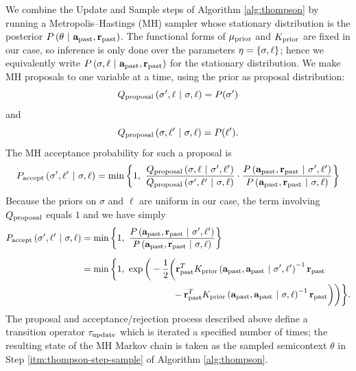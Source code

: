 We combine the Update and Sample steps of Algorithm \ref{alg:thompson} by
running a Metropolis--Hastings (MH) sampler whose stationary distribution is the
posterior $P\left( \theta \ \middle\vert\  \mathbf{a}_{\textrm{past}}, \mathbf{r}_{\textrm{past}} \right)$.  The functional forms of
$\mu_{\textrm{prior}}$ and $K_{\textrm{prior}}$ are fixed in our case, so inference is only done
over the parameters $\eta = \left\{ \sigma,\ell \right\}$; hence we equivalently write
$P\left( \sigma,\ell \ \middle\vert\  \mathbf{a}_{\textrm{past}}, \mathbf{r}_{\textrm{past}} \right)$ for the stationary
distribution.  We make MH proposals to one variable at a time, using the prior
as proposal distribution:
\[
  Q_{\textrm{proposal}}\left( \sigma',\ell \ \middle\vert\  \sigma,\ell \right) = P(\sigma')
\]
and
\[
  Q_{\textrm{proposal}}\left( \sigma,\ell' \ \middle\vert\  \sigma,\ell \right) = P(\ell').
\]
The MH acceptance probability for such a proposal is
\[
  P_{\textrm{accept}}\left( \sigma',\ell' \ \middle\vert\  \sigma,\ell \right)
  =
  \min\left\{ 1,\ \frac{
    Q_{\textrm{proposal}}\left( \sigma,\ell \ \middle\vert\  \sigma',\ell' \right)
    }{
    Q_{\textrm{proposal}}\left( \sigma',\ell' \ \middle\vert\  \sigma,\ell \right)
    }
  \cdot
  \frac{
    P\left( \mathbf{a}_{\textrm{past}},\mathbf{r}_{\textrm{past}} \ \middle\vert\  \sigma',\ell' \right)
    }{
    P\left( \mathbf{a}_{\textrm{past}},\mathbf{r}_{\textrm{past}} \ \middle\vert\  \sigma,\ell \right)
    } \right\}
\]
Because the priors on $\sigma$ and $\ell$ are uniform in our case, the term
involving $Q_{\textrm{proposal}}$ equals $1$ and we have simply
\begin{align*}
  P_{\textrm{accept}}\left( \sigma',\ell' \ \middle\vert\  \sigma,\ell \right)
  &=
  \min\left\{ 1,\ \frac{
    P\left( \mathbf{a}_{\textrm{past}},\mathbf{r}_{\textrm{past}} \ \middle\vert\  \sigma',\ell' \right)
    }{
    P\left( \mathbf{a}_{\textrm{past}},\mathbf{r}_{\textrm{past}} \ \middle\vert\  \sigma,\ell \right)
    } \right\} \\[2mm]
  &=
  \min\bigg\{1,\ \exp\bigg( -\frac12\bigg(
    \mathbf{r}_{\textrm{past}}^T K_{\textrm{prior}}\left( \mathbf{a}_{\textrm{past}}, \mathbf{a}_{\textrm{past}} \ \middle\vert\  \sigma', \ell' \right)^{-1} \mathbf{r}_{\textrm{past}} \\
  & \qquad\qquad\qquad\qquad\qquad -
    \mathbf{r}_{\textrm{past}}^T K_{\textrm{prior}}\left( \mathbf{a}_{\textrm{past}}, \mathbf{a}_{\textrm{past}} \ \middle\vert\  \sigma, \ell \right)^{-1} \mathbf{r}_{\textrm{past}}
  \bigg)\bigg)\bigg\}.
\end{align*}
The proposal and acceptance/rejection process described above define a
transition operator $\tau_{\textrm{update}}$ which is iterated a specified number of
times; the resulting state of the MH Markov chain is taken as the sampled
semicontext $\theta$ in Step \ref{itm:thompson-step-sample} of Algorithm
\ref{alg:thompson}.

